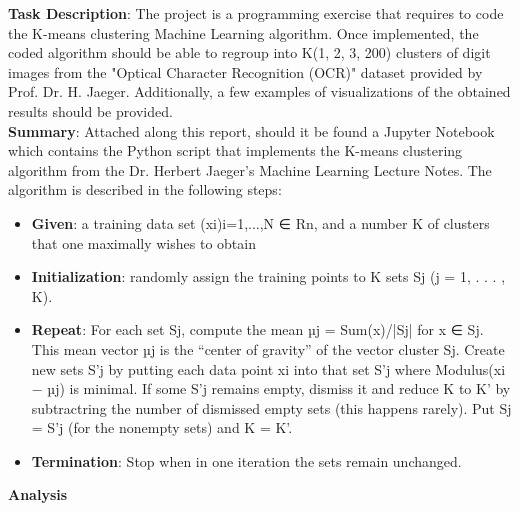 \documentclass[a4 paper]{article}
\begin{document}

\textbf{Task Description}: 
The project is a programming exercise that requires to code the K-means clustering Machine Learning algorithm. Once implemented, the coded algorithm should be able to regroup into K(1, 2, 3, 200) clusters of digit images from the "Optical Character Recognition (OCR)" dataset provided by Prof. Dr. H. Jaeger. Additionally, a few examples of visualizations of the obtained results should be provided. 
\\
\newline
\textbf{Summary}: Attached along this report, should it be found a Jupyter Notebook which contains the Python script that  implements the K-means clustering algorithm from the Dr. Herbert Jaeger's Machine Learning Lecture Notes. The algorithm is described in the following steps:
\begin{itemize}
    \item \textbf{Given}: a training data set (xi)i=1,...,N ∈ Rn, and a number K of clusters that one maximally wishes to obtain
    \item \textbf{Initialization}: randomly assign the training points to K sets Sj (j = 1, . . . , K).
    \item \textbf{Repeat}: For each set Sj, compute the mean µj = Sum(x)/|Sj| for x ∈ Sj. This mean vector µj is the “center of gravity” of the vector cluster Sj. Create new sets S'j by putting each data point xi into that set S'j where Modulus(xi − µj) is minimal. If some S'j remains empty, dismiss it and reduce K to K' by subtractring the number of dismissed empty sets (this happens rarely). Put Sj = S'j (for the nonempty sets) and K = K'.
    \item \textbf{Termination}: Stop when in one iteration the sets remain unchanged.
\end{itemize}

\begin{center} 
\large{\textbf{Analysis}} 
\end{center}
\end{document}
